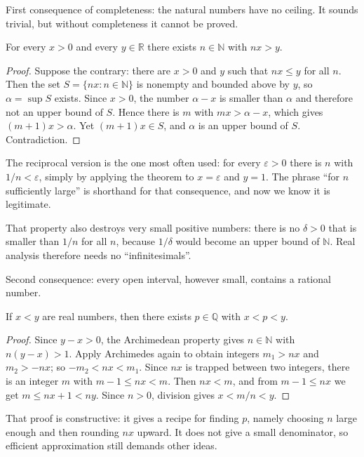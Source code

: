 First consequence of completeness: the natural numbers have no ceiling. It sounds
trivial, but without completeness it cannot be proved.

\begin{teorema}
For every $x>0$ and every $y\in\mathbb{R}$ there exists $n\in\mathbb{N}$ with
$nx>y$.
\end{teorema}

\begin{proof}
Suppose the contrary: there are $x>0$ and $y$ such that $nx\le y$ for all $n$. Then the
set $S=\{nx: n\in\mathbb{N}\}$ is nonempty and bounded above by $y$, so
$\alpha=\sup S$ exists. Since $x>0$, the number $\alpha-x$ is smaller than $\alpha$ and
therefore not an upper bound of $S$. Hence there is $m$ with $mx>\alpha-x$, which gives
$(m+1)x>\alpha$. Yet $(m+1)x\in S$, and $\alpha$ is an upper bound of $S$. Contradiction.
\end{proof}

The reciprocal version is the one most often used: for every $\varepsilon>0$ there is
$n$ with $1/n<\varepsilon$, simply by applying the theorem to $x=\varepsilon$ and
$y=1$. The phrase ``for $n$ sufficiently large'' is shorthand for that consequence, and
now we know it is legitimate.

That property also destroys very small positive numbers: there is no $\delta>0$ that is
smaller than $1/n$ for all $n$, because $1/\delta$ would become an upper bound of
$\mathbb{N}$. Real analysis therefore needs no ``infinitesimals''.

Second consequence: every open interval, however small, contains a rational number.

\begin{teorema}
If $x<y$ are real numbers, then there exists $p\in\mathbb{Q}$ with $x<p<y$.
\end{teorema}

\begin{proof}
Since $y-x>0$, the Archimedean property gives $n\in\mathbb{N}$ with $n(y-x)>1$. Apply
Archimedes again to obtain integers $m_1>nx$ and $m_2>-nx$; so
$-m_2<nx<m_1$. Since $nx$ is trapped between two integers, there is an integer
$m$ with $m-1\le nx<m$. Then $nx<m$, and from $m-1\le nx$ we get
$m\le nx+1<ny$. Since $n>0$, division gives $x<m/n<y$.
\end{proof}

That proof is constructive: it gives a recipe for finding $p$, namely choosing $n$
large enough and then rounding $nx$ upward. It does not give a small denominator, so
efficient approximation still demands other ideas.

